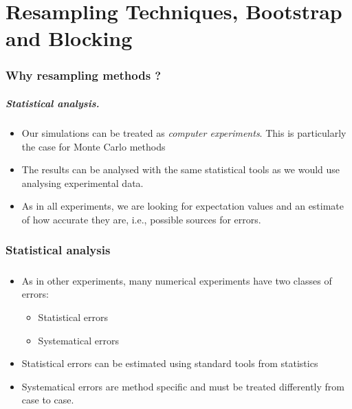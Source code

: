 \chapter{Resampling Techniques, Bootstrap and Blocking}

\subsection*{Why resampling methods ?}

\paragraph{Statistical analysis.}
\begin{itemize}
    \item Our simulations can be treated as \emph{computer experiments}. This is particularly the case for Monte Carlo methods

    \item The results can be analysed with the same statistical tools as we would use analysing experimental data.

    \item As in all experiments, we are looking for expectation values and an estimate of how accurate they are, i.e., possible sources for errors.
\end{itemize}

\noindent

    

\subsection*{Statistical analysis}

\paragraph{}
\begin{itemize}
    \item As in other experiments, many numerical  experiments have two classes of errors:
\begin{itemize}

      \item Statistical errors

      \item Systematical errors

\end{itemize}

\noindent
    \item Statistical errors can be estimated using standard tools from statistics

    \item Systematical errors are method specific and must be treated differently from case to case. 
\end{itemize}

